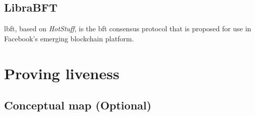 \subsection{LibraBFT}
\gls{lbft}, based on \textit{HotStuff}, is the \gls{bft} consensus protocol that is proposed for use in Facebook's emerging blockchain platform.


\section{Proving liveness}
\subsection{Conceptual map (Optional)}

